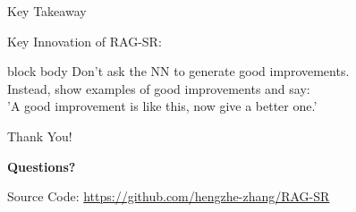 \documentclass[aspectratio=1610]{beamer}
\begin{document}
    \begin{frame}{Key Takeaway}
        \begin{center}
            \Large
            \alert{Key Innovation of RAG-SR:}

            \vspace{0.5cm}

            \begin{beamercolorbox}[rounded=true,shadow=true,sep=1em]{block body}
                Don't ask the NN to generate good improvements.\\
                \vspace{0.3cm}
                Instead, show examples of good improvements and say:\\
                'A good improvement is like this, now give a better one.'
            \end{beamercolorbox}
        \end{center}
    \end{frame}

    \begin{frame}{Thank You!}
        \begin{center}
            \Large{\textbf{Questions?}}

            \vspace{1cm}

            \normalsize
            Source Code: \url{https://github.com/hengzhe-zhang/RAG-SR}
        \end{center}
    \end{frame}
\end{document}
